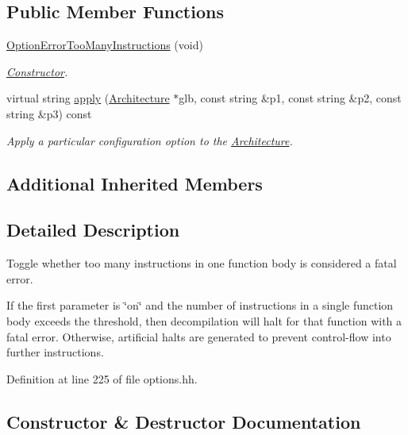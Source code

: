 \subsection*{Public Member Functions}
\begin{DoxyCompactItemize}
\item 
\mbox{\hyperlink{class_option_error_too_many_instructions_af408700ce3149f0481605dd5cac370b4}{Option\+Error\+Too\+Many\+Instructions}} (void)
\begin{DoxyCompactList}\small\item\em \mbox{\hyperlink{class_constructor}{Constructor}}. \end{DoxyCompactList}\item 
virtual string \mbox{\hyperlink{class_option_error_too_many_instructions_a6bf25f21e5f63254c9c48acd1b1490e4}{apply}} (\mbox{\hyperlink{class_architecture}{Architecture}} $\ast$glb, const string \&p1, const string \&p2, const string \&p3) const
\begin{DoxyCompactList}\small\item\em Apply a particular configuration option to the \mbox{\hyperlink{class_architecture}{Architecture}}. \end{DoxyCompactList}\end{DoxyCompactItemize}
\subsection*{Additional Inherited Members}


\subsection{Detailed Description}
Toggle whether too many instructions in one function body is considered a fatal error. 

If the first parameter is \char`\"{}on\char`\"{} and the number of instructions in a single function body exceeds the threshold, then decompilation will halt for that function with a fatal error. Otherwise, artificial halts are generated to prevent control-\/flow into further instructions. 

Definition at line 225 of file options.\+hh.



\subsection{Constructor \& Destructor Documentation}
\mbox{\label{class_option_error_too_many_instructions_af408700ce3149f0481605dd5cac370b4}} 
